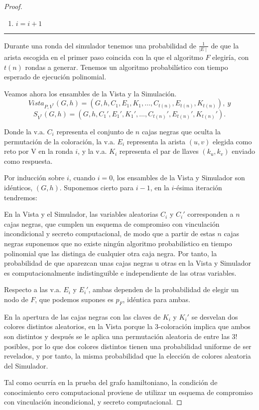 \begin{proof}
\begin{enumerate}
		\item $i = i+1$
		
	\end{enumerate}
	
	\rule{\textwidth}{1pt}
	
	\hfill
	
	Durante una ronda del simulador tenemos una probabilidad de $\frac{1}{\mid E \mid}$ de que la arista escogida en el primer paso coincida con la que el algoritmo $F$ elegiría, con $t(n)$ rondas a generar. Tenemos un algoritmo probabilístico con tiempo esperado de ejecución polinomial.
	
	
	Veamos ahora los ensambles de la Vista y la Simulación.
	\[Vista_{P,V^*}(G,h) = (G,h,C_1,E_1,K_1,\dots , C_{t(n)}, E_{t(n)}, K_{t(n)}),\ y \]
	\[S_{V^*}(G,h) = (G,h,C_1',E_1',K_1',\dots , C_{t(n)}', E_{t(n)}', K_{t(n)}').\]
	
	Donde la v.a. $C_i$ representa el conjunto de $n$ cajas negras que oculta la permutación de la coloración, la v.a. $E_i$ representa la arista $(u,v)$ elegida como reto por V en la ronda $i$, y la v.a. $K_i$ representa el par de llaves $(k_u,k_v)$ enviado como respuesta.
	
	Por inducción sobre $i$, cuando $i=0$, los ensambles de la Vista y Simulador son idénticos, $(G,h)$. Suponemos cierto para $i-1$, en la $i$-ésima iteración tendremos:
	
	
	En la Vista y el Simulador, las variables aleatorias $C_i$ y $C_i'$ corresponden a $n$ cajas negras, que cumplen un esquema de compromiso con vinculación incondicional y secreto computacional, de modo que a partir de estas $n$ cajas negras suponemos que no existe ningún algoritmo probabilístico en tiempo polinomial que las distinga de cualquier otra caja negra. Por tanto, la probabilidad de que aparezcan unas cajas negras u otras en la Vista y Simulador es computacionalmente indistinguible e independiente de las otras variables.
	
	Respecto a las v.a. $E_i$ y $E_i'$, ambas dependen de la probabilidad de elegir un nodo de $F$, que podemos supones es $p_F$, idéntica para ambas.
	
	En la apertura de las cajas negras con las claves de $K_i$ y $K_i'$ se desvelan dos colores distintos aleatorios, en la Vista porque la 3-coloración implica que ambos son distintos y después se le aplica una permutación aleatoria de entre las $3!$ posibles, por lo que dos colores distintos tienen una probabilidad uniforme de ser revelados, y por tanto, la misma probabilidad que la elección de colores aleatoria del Simulador.
	
	Tal como ocurría en la prueba del grafo hamiltoniano, la condición de conocimiento cero computacional proviene de utilizar un esquema de compromiso con vinculación incondicional, y secreto computacional.
\end{proof}




